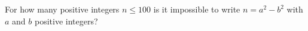 For how many positive integers $n\le100$ is it impossible to write $n=a^2-b^2$ with $a$ and $b$ positive integers?

